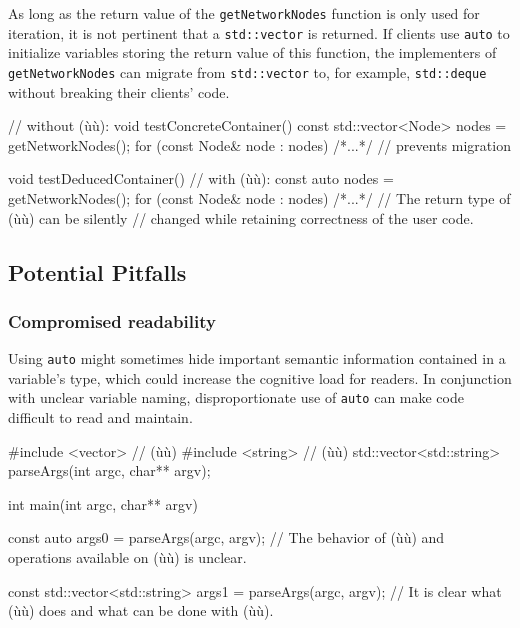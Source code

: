\noindent As long as the return value of the \lstinline!getNetworkNodes! function is
only used for iteration, it is not pertinent that a \lstinline!std::vector! is
returned. If clients use \lstinline!auto! to initialize
variables storing the return value of this function, the implementers of
\lstinline!getNetworkNodes! can migrate from \lstinline!std::vector! to,
for example, \lstinline!std::deque! without breaking their clients'
code.

\begin{emcppslisting}[emcppsbatch=e11]
// without (ù{}ù):
void testConcreteContainer()
{
    const std::vector<Node> nodes = getNetworkNodes();
    for (const Node& node : nodes) { /*...*/ }
        // prevents migration
}

void testDeducedContainer()
{
    // with (ù{}ù):
    const auto nodes = getNetworkNodes();
    for (const Node& node : nodes) { /*...*/ }
        // The return type of (ù{}ù) can be silently
        // changed while retaining correctness of the user code.
}
\end{emcppslisting}
    

\subsection[Potential Pitfalls]{Potential Pitfalls}\label{potential-pitfalls-auto}

\subsubsection[Compromised readability]{Compromised readability}\label{compromised-readability}

Using \lstinline!auto! might sometimes hide important semantic information contained in a
variable's type, which could increase the cognitive load for readers. In conjunction
with unclear variable naming, disproportionate use of \lstinline!auto! can
make code difficult to read and maintain.

\begin{emcppshiddenlisting}[emcppsbatch=e12]
#include <vector>  // (ù{}ù)
#include <string>  // (ù{}ù)
std::vector<std::string> parseArgs(int argc, char** argv);
\end{emcppshiddenlisting}
\begin{emcppslisting}[emcppsbatch=e12]
int main(int argc, char** argv)
{
    const auto args0 = parseArgs(argc, argv);
        // The behavior of (ù{}ù) and operations available on (ù{}ù) is unclear.

    const std::vector<std::string> args1 = parseArgs(argc, argv);
        // It is clear what (ù{}ù) does and what can be done with (ù{}ù).
}
\end{emcppslisting}
    
